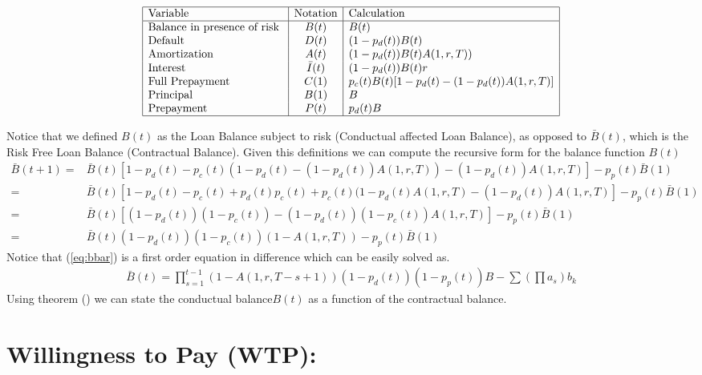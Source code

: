 \documentclass[12pt]{book}
\begin{document}
\begin{center} %
\[ %
\begin{array}{|l|c|l|} \hline %
\mbox{Variable} &\mbox{Notation} & \mbox{Calculation}\\ \hline
\mbox{Balance in presence of risk }  & B(t)  & B(t)\\
\mbox{Default  }  & D(t) & (1-p_d(t)) B(t)\\
\mbox{Amortization}  & A(t) &(1-p_d(t)) B(t)A(1,r,T))\\
\mbox{Interest }  & \bar{ I}(t) & (1-p_d(t))B(t)r\\
\mbox{Full Prepayment}  & C(1) & p_c(t) B(t)[1-p_d(t)-(1-p_d(t))A(1,r,T)]\\
\mbox{Principal   }  &  B(1) & B\\
\mbox{Prepayment  }  & P(t) & p_d(t)B\\
\hline
\end{array} %
\] %
\end{center}
\pagebreak
Notice that we defined $B(t)$ as the Loan Balance subject to risk (Conductual affected Loan Balance), as opposed to $\bar{B}(t)$, which is the Risk Free Loan Balance (Contractual Balance).  Given this definitions we can compute the recursive form for the balance function $B(t)$
\begin{align}
\scriptstyle
     \bar{B}(t+1) =&\scriptstyle \bar{B}(t)[1-p_d(t)-p_c(t)(1-p_d(t)-(1-p_d(t))A(1,r,T))-(1-p_d(t))A(1,r,T) ]-p_p(t) \bar{B}(1) \nonumber\\
    =&\scriptstyle \bar{B}(t)[1-p_d(t)-p_c(t)+p_d(t)p_c(t)+p_c(t)(1-p_d(t)A(1,r,T)-(1-p_d(t))A(1,r,T)]
    -p_p(t) \bar{B}(1) \nonumber\\
    =&\scriptstyle
    \bar{B}(t)[ (1-p_d(t))(1-p_c(t))-(1-p_d(t))(1-p_c(t))A(1,r,T)]
    -p_p(t) \bar{B}(1) \nonumber\\
     =&\scriptstyle
    \bar{B}(t)(1-p_d(t))(1-p_c(t))(1-A(1,r,T))
    -p_p(t) \bar{B}(1) \label{eq:bbar}\
\end{align}
Notice that (\ref{eq:bbar}) is a first order equation in difference which can be easily solved as.
\begin{align}
    \bar{B}(t) =\prod^{t-1}_{s=1} (1-A(1,r,T-s+1))(1-p_d(t))(1-p_p(t))B-\sum (\prod a_s) b_k
\end{align}
Using theorem () we can state the conductual balance$B(t)$ as a function of the contractual balance.



\section{Willingness to Pay (WTP): }
\end{document}
